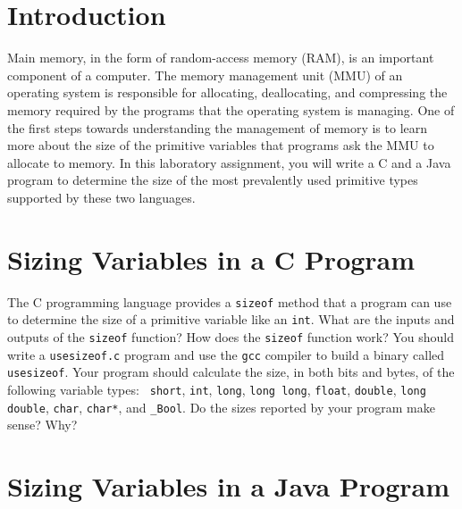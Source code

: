 


\usepackage[compact]{titlesec}



\section*{Introduction}

  Main memory, in the form of random-access memory (RAM), is an important component of a computer.  The memory management
  unit (MMU) of an operating system is responsible for allocating, deallocating, and compressing the memory required by
  the programs that the operating system is managing. One of the first steps towards understanding the management of
  memory is to learn more about the size of the primitive variables that programs ask the MMU to allocate to memory. In
  this laboratory assignment, you will write a C and a Java program to determine the size of the most prevalently used
  primitive types supported by these two languages. 

\section*{Sizing Variables in a C Program}

  The C programming language provides a {\tt sizeof} method that a program can use to determine the size of a primitive
  variable like an {\tt int}. What are the inputs and outputs of the {\tt sizeof} function? How does the {\tt sizeof}
  function work? You should write a {\tt usesizeof.c} program and use the {\tt gcc} compiler to build a binary called
  {\tt usesizeof}. Your program should calculate the size, in both bits and bytes, of the following variable types: {\tt
  short}, {\tt int}, {\tt long}, {\tt long long}, {\tt float}, {\tt double}, {\tt long double}, {\tt char}, {\tt char*},
  and {\tt \_Bool}. Do the sizes reported by your program make sense? Why?

\section*{Sizing Variables in a Java Program}


